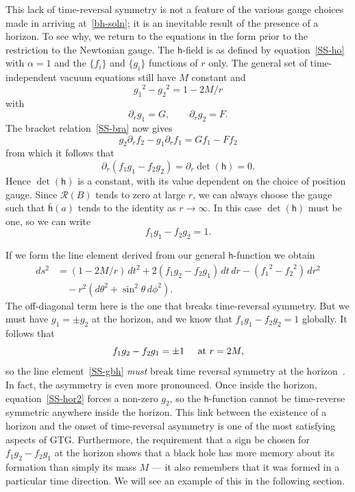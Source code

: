 \documentclass[a4paper]{article}
\numberwithin{equation}{section}
\newcommand{\hs}[1]{\hspace*{#1cm}}
\newcommand{\nn}{\nonumber}
\newcommand{\alp}{\alpha}
\newcommand{\clr}{{\mathcal{R}}}
\newcommand{\dr}{\partial_r}
\newcommand{\lih}{\mathsf{h}}
\newcommand{\lbh}{\bar{\mathsf{h}}}
\newcommand{\ho}{\lbh}
\newcommand{\hu}{\lih}
\renewcommand{\dh}{\det(\hu)}
\begin{document}
This lack of time-reversal symmetry is not a feature of the various
gauge choices made in arriving at~\eqref{bh-soln}; it is an inevitable
result of the presence of a horizon.  To see why, we return to the
equations in the form prior to the restriction to the Newtonian gauge.
The $\lih$-field is as defined by equation~\eqref{SS-ho} with $\alp=1$ and
the $\{f_i\}$ and $\{g_i\}$ functions of $r$ only.  The general set of
time-independent vacuum equations still have $M$ constant and
%
\begin{equation}
{g_1}^2 - {g_2}^2 = 1 - 2M/r
\label{SS-hor2}
\end{equation}
%
with
%
\begin{equation}
\dr g_1 = G, \qquad \dr g_2 = F.
\label{SS-int4}
\end{equation}
%
The bracket relation~\eqref{SS-bra} now gives
%
\begin{equation}
g_2 \dr f_2 - g_1 \dr f_1 = Gf_1 - F f_2 
\end{equation}
%
from which it follows that
%
\begin{equation}
\dr(f_1g_1 - f_2 g_2) = \dr \dh = 0.
\end{equation} 
%
Hence $\dh$ is a constant, with its value dependent on the choice of
position gauge.  Since $\clr(B)$ tends to zero at large $r$, we can
always choose the gauge such that $\ho(a)$ tends to the identity as
$r\rightarrow\infty$.  In this case $\dh$ must be one, so we can write
%
\begin{equation}
f_1g_1 - f_2 g_2 = 1.
\end{equation}
%


If we form the line element derived from our general
$\lih$-function we obtain
%
\begin{align}
ds^2 &= (1-2M/r) \, dt^2 +2 (f_1g_2 - f_2g_1) \, dt\, dr -({f_1}^2 -
{f_2}^2) \, dr^2 \nn \\
&\quad -r^2( d\theta^2 + \sin^2\! \theta \, d\phi^2).
\label{SS-gbh}
\end{align}
%
The off-diagonal term here is the one that breaks time-reversal
symmetry.  But we must have $g_1 = \pm g_2$ at the horizon, and we
know that $f_1g_1 - f_2g_2=1$ globally.  It follows that
%
\begin{equation}
f_1 g_2 - f_2 g_1 = \pm 1 \hs{0.5} \mbox{at} \,\, r = 2M,
\end{equation} 
%
so the line element~\eqref{SS-gbh} \textit{must} break time reversal
symmetry at the horizon~\cite{DGL-grav-bel}.  In fact, the asymmetry
is even more pronounced.  Once inside the horizon,
equation~\eqref{SS-hor2} forces a non-zero $g_2$, so the $\lih$-function
cannot be time-reverse symmetric anywhere inside the horizon.  This
link between the existence of a horizon and the onset of time-reversal
asymmetry is one of the most satisfying aspects of GTG.  Furthermore,
the requirement that a sign be chosen for $f_1g_2-f_2g_1$ at the
horizon shows that a black hole has more memory about its formation
than simply its mass $M$ --- it also remembers that it was formed in a
particular time direction.  We will see an example of this in the
following section.
\end{document}
